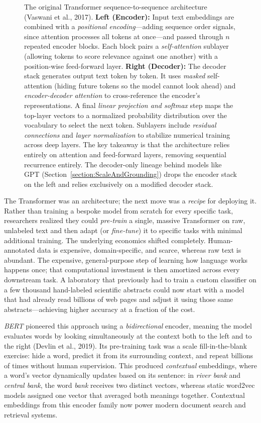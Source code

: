 \begin{figure}[t]
\centering

\caption{The original Transformer sequence-to-sequence architecture (Vaswani et al., 2017).
\textbf{Left (Encoder):} Input text embeddings are combined with a \emph{positional encoding}—adding sequence order signals, since attention processes all tokens at once—and passed through $n$ repeated encoder blocks. Each block pairs a \emph{self-attention} sublayer (allowing tokens to score relevance against one another) with a position-wise feed-forward layer.
\textbf{Right (Decoder):} The decoder stack generates output text token by token. It uses \emph{masked} self-attention (hiding future tokens so the model cannot look ahead) and \emph{encoder-decoder attention} to cross-reference the encoder's representations.
A final \emph{linear projection and softmax} step maps the top-layer vectors to a normalized probability distribution over the vocabulary to select the next token.
Sublayers include \emph{residual connections} and \emph{layer normalization} to stabilize numerical training across deep layers.
The key takeaway is that the architecture relies entirely on attention and feed-forward layers, removing sequential recurrence entirely.
The decoder-only lineage behind models like GPT (Section~\ref{section:ScaleAndGrounding}) drops the encoder stack on the left and relies exclusively on a modified decoder stack.}
\label{figure:Transformer}
\end{figure}

The Transformer was an architecture; the next move was a \emph{recipe} for deploying it.
Rather than training a bespoke model from scratch for every specific task, researchers realized they could \emph{pre-train} a single, massive Transformer on raw, unlabeled text and then adapt (or \emph{fine-tune}) it to specific tasks with minimal additional training.
The underlying economics shifted completely.
Human-annotated data is expensive, domain-specific, and scarce, whereas raw text is abundant.
The expensive, general-purpose step of learning how language works happens once; that computational investment is then amortized across every downstream task.
A laboratory that previously had to train a custom classifier on a few thousand hand-labeled scientific abstracts could now start with a model that had already read billions of web pages and adjust it using those same abstracts—achieving higher accuracy at a fraction of the cost.

\emph{BERT} pioneered this approach using a \emph{bidirectional} encoder, meaning the model evaluates words by looking simultaneously at the context both to the left and to the right (Devlin et al., 2019).
Its pre-training task was a scale fill-in-the-blank exercise: hide a word, predict it from its surrounding context, and repeat billions of times without human supervision.
This produced \emph{contextual} embeddings, where a word's vector dynamically updates based on its sentence: in \emph{river bank} and \emph{central bank}, the word \emph{bank} receives two distinct vectors, whereas static word2vec models assigned one vector that averaged both meanings together.
Contextual embeddings from this encoder family now power modern document search and retrieval systems.

